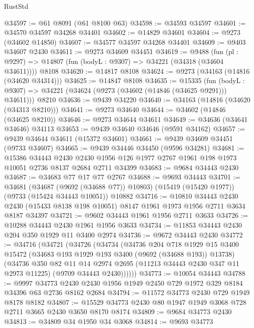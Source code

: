 \begin{lexlean}{RustStd}
\begin{coremodule}
@34597 := @61 @8091 (@61 @8100 @63)
@34598 := @34593 @34597
@34601 := @34570 @34597 @34268 @34401
@34602 := @14829 @34601
@34604 := @9273 (@34602 @14850)
@34607 := @34577 @34597 @34268 @34401
@34609 := @9403 @34607 @2430
@34611 := @9273 @34609 @34451
@34619 := @9488
    (fun (pl : @9297) => @14807 (fun (bodyL : @9307) => @34221 (@34318 (@34604 @34611))))
    @8108
@34620 := @14817 @8108
@34624 := @9273 (@34163 (@14816 (@34620 @34314)))
@34625 := @14847 @8108
@34635 := @15335
    (fun (bodyL : @9307) => @34221 (@34624 (@9273 (@34602 (@14846 (@34625 @9291))) @34611)))
    @8210
@34636 := @9439 @34220
@34640 := @34163 (@14816 (@34620 (@34313 @8210)))
@34641 := @9273 @34640
@34644 := @34602 (@14846 (@34625 @8210))
@34646 := @9273 @34644 @34611
@34649 := @34636 (@34641 @34646) @34113
@34653 := @9439 @34640 @34646 (@9591 @34162)
@34657 := @9439 @34644 @34611 (@15372 @34601)
@34661 := @9439 @34609 @34451 (@9733 @34607)
@34665 := @9439 @34446 @34450 (@9596 @34281)
@34681 := @15386
    @34443
    @2430
    @2430
    @1956
    @126
    @1977
    @2767
    @1961
    @198
    @1973
    @10051
    @2736
    @8137
    @2684
    @2711
    @34399
@34683 := @9684 @34443 @2430
@34687 := @34683 @77 @17 @77 @2767
@34688 := @9693 @34443
@34701 := @34681
    (@34687 (@9692 (@34688 @77)) @10803)
    (@15419 (@15420 @1977))
    (@9733 (@15424 @34443 @10051))
    @10882
@34716 := @10810
    @34443
    @2430
    @2430
    (@15433 @8138 @198 @10051)
    @8147
    @1961
    @1973
    @1956
    @2711
    @3634
    @8187
    @34397
@34721 := @9602 @34443 @1961 @1956 @2711 @3633
@34726 := @10288 @34443 @2430 @1961 @1956 @3633
@34734 := @11853 @34443 @2430 @204 @350 @1929 @11 @3400 @2974
@34736 := @9672 @34443 @2430
@34772 := @34716
    (@34721
      (@34726
        (@34734
          (@34736
            @204
            @718
            @1929
            @15
            @3400
            @15472
            (@34683 @193 @1929 @193 @3400 (@9692 (@34688 @193)) @13738)
            (@34736
              @350
              @82
              @11
              @14
              @2974
              @2695
              (@11213 @34443 @2430 @347 @11 @2973 @11225)
              (@9709 @34443 @2430))))))
@34773 := @10054 @34443
@34788 := @9997
    @34773
    @2430
    @2430
    @1956
    @1949
    @2450
    @729
    @1972
    @329
    @8184
    @34396
    @63
    @2736
    @8162
    @2684
@34794 := @11572 @34773 @2430 @729 @1949 @8178 @8182
@34807 := @15529 @34773 @2430 @80 @1947 @1949 @3068 @728 @2711 @3665 @2430 @3650 @8170 @8174
@34809 := @9684 @34773 @2430
@34813 := @34809 @34 @1950 @34 @3068
@34814 := @9693 @34773

\end{coremodule}
\end{lexlean}
